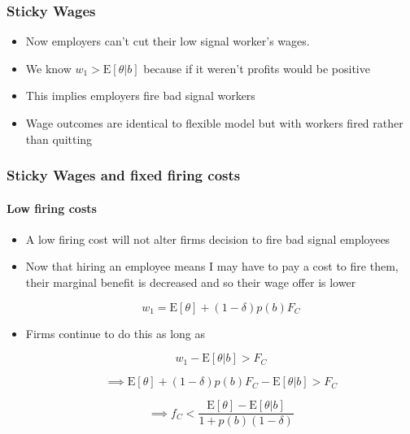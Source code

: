 \documentclass{beamer}
\newcommand{\E}{\mathrm{E}}
\begin{document}
\begin{frame}
\frametitle{Sticky Wages}

\begin{itemize}
	\setlength{\itemsep}{5mm}
	\item Now employers can't cut their low signal worker's wages. 
	\item We know $w_1 > \E[\theta|b]$ because if it weren't profits would be positive
	\item This implies employers fire bad signal workers 
	\item Wage outcomes are identical to flexible model but with workers fired rather than quitting 
	
\end{itemize}

\end{frame}


\begin{frame}
\frametitle{Sticky Wages and fixed firing costs}

\framesubtitle{Low firing costs}

\begin{itemize}
	\setlength{\itemsep}{3mm}
	\item A low firing cost will not alter firms decision to fire bad signal employees 
	\item  Now that hiring an employee means I may have to pay a cost to fire them, their marginal benefit is decreased and so their wage offer is lower
	
	$$ w_1 = \E[\theta] + (1- \delta)p(b)F_C$$
	
	\item Firms continue to do this as long as
	
	$$ w_1 - \E[\theta|b] > F_C$$
	
$$ \implies  \E[\theta] + (1- \delta)p(b)F_C -  \E[\theta|b] > F_C $$

$$ \implies f_C < \frac{\E[\theta] -  \E[\theta|b]}{1 + p(b)(1-\delta)} $$
	
\end{itemize}

\end{frame}
\end{document}
